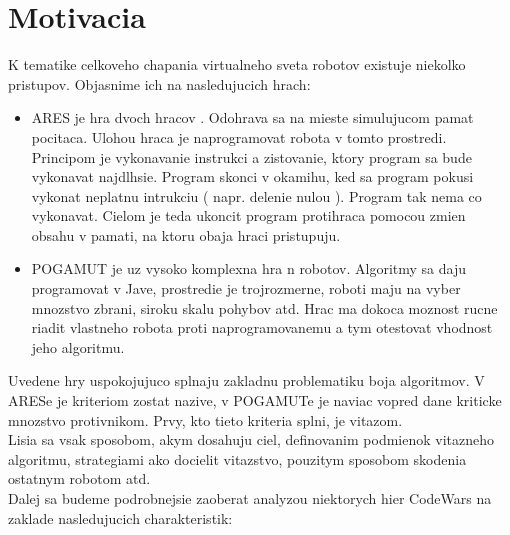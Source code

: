 \documentclass[a4paper,11pt,final]{report}
\begin{document}
\section{Motivacia}
K tematike celkoveho chapania virtualneho sveta robotov existuje niekolko pristupov. Objasnime ich na nasledujucich hrach:
\begin{itemize}
\item ARES je hra dvoch  hracov . Odohrava sa na mieste simulujucom pamat pocitaca. Ulohou hraca je naprogramovat robota v tomto prostredi. Principom je vykonavanie instrukci a zistovanie, ktory program  sa bude vykonavat najdlhsie. Program skonci v okamihu, ked sa program pokusi vykonat neplatnu intrukciu ( napr. delenie nulou ). Program tak nema co vykonavat. Cielom je teda ukoncit program protihraca pomocou zmien obsahu v pamati, na ktoru obaja hraci pristupuju. %
\item POGAMUT je uz vysoko komplexna hra n robotov. Algoritmy sa daju programovat v Jave, prostredie je trojrozmerne, roboti maju na vyber mnozstvo zbrani, siroku skalu pohybov atd. Hrac ma dokoca moznost rucne riadit vlastneho robota proti naprogramovanemu a tym otestovat vhodnost jeho algoritmu.
\end{itemize}
Uvedene hry uspokojujuco splnaju zakladnu problematiku boja algoritmov. V ARESe je kriteriom zostat nazive, v POGAMUTe je naviac vopred dane kriticke mnozstvo protivnikom. Prvy, kto tieto kriteria splni, je vitazom.\\
Lisia sa vsak sposobom, akym dosahuju ciel, definovanim podmienok vitazneho algoritmu, strategiami ako docielit vitazstvo, pouzitym sposobom skodenia ostatnym robotom atd. \\
Dalej sa budeme podrobnejsie zaoberat analyzou niektorych hier CodeWars na zaklade nasledujucich charakteristik:
\end{document}
